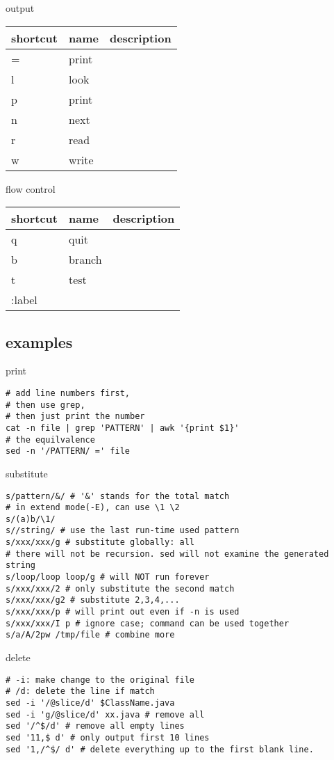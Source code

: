 output

\begin{tabular}{l|l|l}
shortcut & name & description\\
\hline
= & print & \\
l & look & \\
p & print & \\
n & next & \\
r & read & \\
w & write & \\
\end{tabular}

flow control

\begin{tabular}{l|l|l}
shortcut & name & description\\
\hline
q & quit & \\
b & branch & \\
t & test & \\
:label &  & \\
\end{tabular}
\subsection{examples}

print

\begin{lstlisting}
# add line numbers first,
# then use grep,
# then just print the number
cat -n file | grep 'PATTERN' | awk '{print $1}'
# the equilvalence
sed -n '/PATTERN/ =' file
\end{lstlisting}

substitute

\begin{lstlisting}
s/pattern/&/ # '&' stands for the total match
# in extend mode(-E), can use \1 \2
s/(a)b/\1/
s//string/ # use the last run-time used pattern
s/xxx/xxx/g # substitute globally: all
# there will not be recursion. sed will not examine the generated string
s/loop/loop loop/g # will NOT run forever
s/xxx/xxx/2 # only substitute the second match
s/xxx/xxx/g2 # substitute 2,3,4,...
s/xxx/xxx/p # will print out even if -n is used
s/xxx/xxx/I p # ignore case; command can be used together
s/a/A/2pw /tmp/file # combine more
\end{lstlisting}

delete

\begin{lstlisting}
# -i: make change to the original file
# /d: delete the line if match
sed -i '/@slice/d' $ClassName.java
sed -i 'g/@slice/d' xx.java # remove all
sed '/^$/d' # remove all empty lines
sed '11,$ d' # only output first 10 lines
sed '1,/^$/ d' # delete everything up to the first blank line.
\end{lstlisting}


